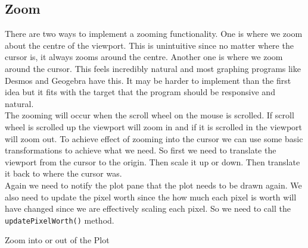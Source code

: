 \documentclass[../../../../main.tex]{subfiles}
\begin{document}
\subsection{Zoom}
There are two ways to implement a zooming functionality. One is where we zoom about the centre of the viewport. This is unintuitive since no matter where the cursor is, it always zooms around the centre. Another one is where we zoom around the cursor. This feels incredibly natural and most graphing programs like Desmos and Geogebra have this. It may be harder to implement than the first idea but it fits with the target that the program should be responsive and natural.\\
The zooming will occur when the scroll wheel on the mouse is scrolled. If scroll wheel is scrolled up the viewport will zoom in and if it is scrolled in the viewport will zoom out. To achieve effect of zooming into the cursor we can use some basic transformations to achieve what we need. So first we need to translate the viewport from the cursor to the origin. Then scale it up or down. Then translate it back to where the cursor was.\\
Again we need to notify the plot pane that the plot needs to be drawn again. We also need to update the pixel worth since the how much each pixel is worth will have changed since we are effectively scaling each pixel. So we need to call the \texttt{updatePixelWorth()} method.
\begin{algorithm}
\DontPrintSemicolon
\caption{Zoom into or out of the Plot}
\end{algorithm}
\newpage
\end{document}
